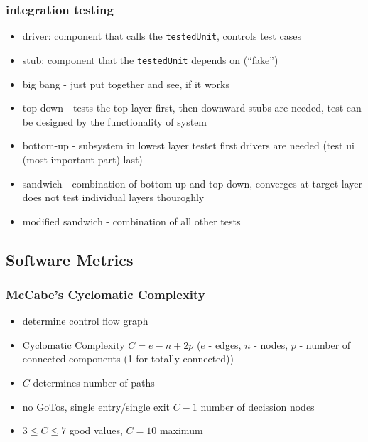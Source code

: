 \documentclass[a4paper, 10pt]{article}
\begin{document}
\subsubsection{integration testing}
\begin{itemize}
	\item driver: component that calls the \texttt{testedUnit}, controls test cases
	\item stub: component that the \texttt{testedUnit} depends on (``fake'')
	\item big bang - just put together and see, if it works
	\item top-down - tests the top layer first, then downward \follows stubs are needed, test can be designed by the functionality of system
	\item bottom-up - subsystem in lowest layer testet first \follows drivers are needed (test ui (most important part) last)
	\item sandwich - combination of bottom-up and top-down, converges at target layer \follows does not test individual layers thouroghly
	\item modified sandwich - combination of all other tests
\end{itemize}

\subsection{Software Metrics}
\subsubsection{McCabe's Cyclomatic Complexity}
\begin{itemize}
	\item determine control flow graph
	\item Cyclomatic Complexity $C=e-n+2p$ ($e$ - edges, $n$ - nodes, $p$ - number of connected components (1 for totally connected)) \\
	\item $C$ determines number of paths
	\item no GoTos, single entry/single exit \follows $C-1$ number of decission nodes
	\item $3\leq C\leq 7$ \follows good values, $C=10$ \follows maximum
\end{itemize}
\end{document}
